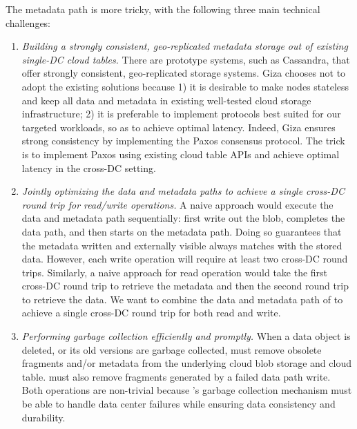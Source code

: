 The metadata path is more tricky, with the following three main technical challenges:
\begin{enumerate}

\item {\it Building a strongly consistent, geo-replicated metadata storage out of existing 
single-DC cloud tables.}
There are prototype systems, such as Cassandra,
that offer strongly consistent, geo-replicated storage systems.
Giza chooses not to adopt the existing solutions because
1) it is desirable to make \name nodes stateless and keep all data and metadata
in existing well-tested cloud storage infrastructure;
2) it is preferable to implement protocols best suited for our targeted workloads,
so as to achieve optimal latency.
Indeed, Giza ensures strong consistency by implementing the Paxos consensus protocol.
The trick is to implement Paxos using existing cloud table APIs and achieve 
optimal latency in the cross-DC setting.

\item {\it Jointly optimizing the data and metadata paths to achieve a single
  cross-DC round trip for read/write operations.} A naive approach would execute
  the data and metadata path sequentially: first write out the blob, completes
  the data path, and then starts on the metadata path. Doing so guarantees that
  the metadata written and externally visible always matches with the stored
  data. However, each write operation will require at least two cross-DC round
  trips. Similarly, a naive approach for read operation would take the first
  cross-DC round trip to retrieve the metadata and then the second round trip to
  retrieve the data. We want to combine the data and metadata path of \name to
  achieve a single cross-DC round trip for both read and write.

\item {\it Performing garbage collection efficiently and promptly.} When a data
  object is deleted, or its old versions are garbage collected, \name must
  remove obsolete fragments and/or metadata from the underlying cloud blob
  storage and cloud table. \name must also remove fragments generated by a
  failed data path write. Both operations are non-trivial because \name's
  garbage collection mechanism must be able to handle data center failures while
  ensuring data consistency and durability.

\end{enumerate}

%


